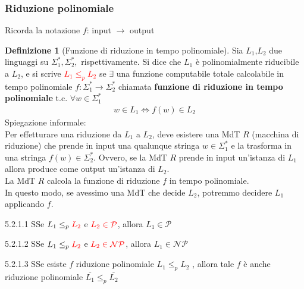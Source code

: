 \documentclass{article}  %
\theoremstyle{definition}
\newtheorem{definition}{Definizione}[section]
\begin{document}
\subsubsection{Riduzione polinomiale}
Ricorda la notazione $f$: input $\rightarrow$ output
\begin{definition}[Funzione di riduzione in tempo polinomiale]
	Sia $L_1$,$L_2$ due linguaggi su $\Sigma_{1}^*,\Sigma_{2}^*,$ rispettivamente.
	Si dice che $L_1$ è polinomialmente riducibile a $L_2$, e si scrive \textcolor{red}{$L_1 \leq_{p} L_2$} se $\exists$ una funzione computabile totale calcolabile in tempo polinomiale
	$f:\Sigma^*_1 \rightarrow \Sigma^*_2$ chiamata \textbf{funzione di riduzione in tempo polinomiale} t.c. $\forall{w}\in \Sigma^*_1$
	\begin{align*}
		w \in L_1 \iff f(w) \in L_2
	\end{align*}
	Spiegazione informale:\\
	Per effetturare una riduzione da $L_1$ a $L_2$, deve esistere una MdT $R$ (macchina di riduzione) che prende in input
	una qualunque stringa $w \in \Sigma^*_1$ e la trasforma in una stringa $f(w) \in \Sigma^*_2$.
	Ovvero, se la MdT $R$ prende in input un'istanza di $L_1$ allora produce come output un'istanza di $L_2$. \\
	La MdT $R$ calcola la funzione di riduzione $f$ in tempo polinomiale. \\
	In questo modo, se avessimo una MdT che decide $L_2$, potremmo decidere $L_1$ applicando $f$.
\end{definition}
\begin{theorem}{5.2.1.1}
	SSe $L_1 \leq_p \textcolor{red}{L_2}$ e $\textcolor{red}{L_2 \in \mathcal{P}}$, allora $L_1 \in \mathcal{P}$
\end{theorem}
\begin{theorem}{5.2.1.2}
	SSe $L_1 \leq_p \textcolor{red}{L_2}$ e $\textcolor{red}{L_2 \in \mathcal{NP}}$, allora $L_1 \in \mathcal{NP}$
\end{theorem}
\begin{theorem}{5.2.1.3}
	SSe esiste $f$ riduzione polinomiale $L_1 \leq_p L_2$ , allora tale $f$ è anche riduzione polinomiale $\overline{L_1} \leq_p \overline{L_2}$
\end{theorem}
\end{document}
